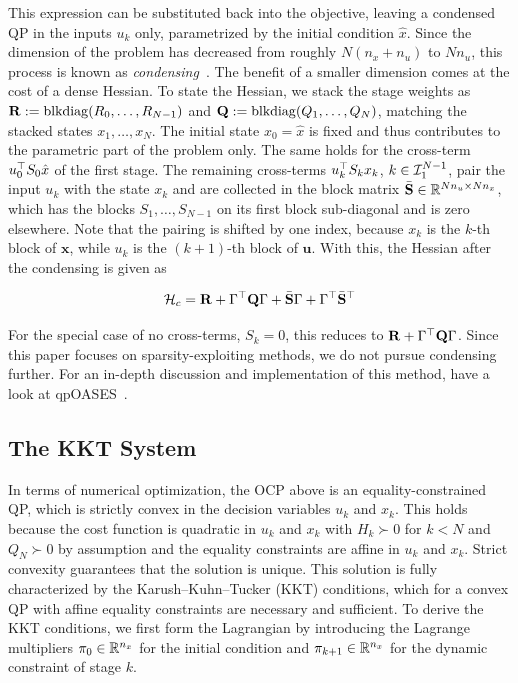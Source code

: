 This expression can be substituted back into the objective, leaving a condensed QP in the inputs $u_k$ only, parametrized by the initial condition $\hat{x}$.
Since the dimension of the problem has decreased from roughly $N(n_x + n_u)$ to $N n_u$, this process is known as \textit{condensing}~\cite{frison2013fast}.
The benefit of a smaller dimension comes at the cost of a dense Hessian.
To state the Hessian, we stack the stage weights as $\mathbf{R} := \operatorname{blkdiag}(R_0, \dots, R_{N-1})$ and $\mathbf{Q} := \operatorname{blkdiag}(Q_1, \dots, Q_N)$, matching the stacked states $x_1,\dots,x_N$.
The initial state $x_0 = \hat{x}$ is fixed and thus contributes to the parametric part of the problem only.
The same holds for the cross-term $u_0^\top S_0 \hat{x}$ of the first stage.
The remaining cross-terms $u_k^\top S_k x_k$, $k \in \mathcal{I}_{1}^{N-1}$, pair the input $u_k$ with the state $x_k$ and are collected in the block matrix $\bar{\mathbf{S}} \in \mathbb{R}^{N n_u \times N n_x}$, which has the blocks $S_1, \dots, S_{N-1}$ on its first block sub-diagonal and is zero elsewhere.
Note that the pairing is shifted by one index, because $x_k$ is the $k$-th block of $\mathbf{x}$, while $u_k$ is the $(k+1)$-th block of $\mathbf{u}$.
With this, the Hessian after the condensing is given as

\[
\mathcal{H}_{c} = \mathbf{R} + \Gamma^\top \mathbf{Q} \Gamma + \bar{\mathbf{S}} \Gamma + \Gamma^\top \bar{\mathbf{S}}^\top
\]

For the special case of no cross-terms, $S_k = 0$, this reduces to $\mathbf{R} + \Gamma^\top \mathbf{Q} \Gamma$.
Since this paper focuses on sparsity-exploiting methods, we do not pursue condensing further.
For an in-depth discussion and implementation of this method, have a look at qpOASES~\cite{ferreau2014qpoases}.

\subsection{The KKT System}
\label{sec:kkt}

In terms of numerical optimization, the OCP above is an equality-constrained QP, which is strictly convex in the decision variables $u_k$ and $x_k$.
This holds because the cost function is quadratic in $u_k$ and $x_k$ with $H_k \succ 0$ for $k < N$ and $Q_N \succ 0$ by assumption and the equality constraints are affine in $u_k$ and $x_k$.
Strict convexity guarantees that the solution is unique.
This solution is fully characterized by the Karush--Kuhn--Tucker (KKT) conditions, which for a convex QP with affine equality constraints are necessary and sufficient.
To derive the KKT conditions, we first form the Lagrangian by introducing the Lagrange multipliers $\pi_0 \in \mathbb{R}^{n_x}$ for the initial condition and $\pi_{k+1} \in \mathbb{R}^{n_x}$ for the dynamic constraint of stage $k$.

